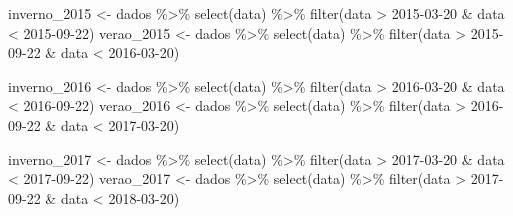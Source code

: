 \documentclass[
]{article}
\newenvironment{Shaded}{\begin{snugshade}}{\end{snugshade}}
\newcommand{\FunctionTok}[1]{\textcolor[rgb]{0.00,0.00,0.00}{#1}}
\newcommand{\NormalTok}[1]{#1}
\newcommand{\OtherTok}[1]{\textcolor[rgb]{0.56,0.35,0.01}{#1}}
\newcommand{\SpecialCharTok}[1]{\textcolor[rgb]{0.00,0.00,0.00}{#1}}
\newcommand{\StringTok}[1]{\textcolor[rgb]{0.31,0.60,0.02}{#1}}
\begin{document}
\begin{Shaded}
\begin{Highlighting}[]
\NormalTok{inverno\_2015 }\OtherTok{\textless{}{-}}\NormalTok{ dados }\SpecialCharTok{\%\textgreater{}\%} \FunctionTok{select}\NormalTok{(data) }\SpecialCharTok{\%\textgreater{}\%} \FunctionTok{filter}\NormalTok{(data }\SpecialCharTok{\textgreater{}} \StringTok{\textquotesingle{}2015{-}03{-}20\textquotesingle{}} \SpecialCharTok{\&}\NormalTok{ data }\SpecialCharTok{\textless{}} \StringTok{\textquotesingle{}2015{-}09{-}22\textquotesingle{}}\NormalTok{)}
\NormalTok{verao\_2015 }\OtherTok{\textless{}{-}}\NormalTok{ dados }\SpecialCharTok{\%\textgreater{}\%} \FunctionTok{select}\NormalTok{(data) }\SpecialCharTok{\%\textgreater{}\%}  \FunctionTok{filter}\NormalTok{(data }\SpecialCharTok{\textgreater{}} \StringTok{\textquotesingle{}2015{-}09{-}22\textquotesingle{}} \SpecialCharTok{\&}\NormalTok{ data }\SpecialCharTok{\textless{}} \StringTok{\textquotesingle{}2016{-}03{-}20\textquotesingle{}}\NormalTok{)}

\NormalTok{inverno\_2016 }\OtherTok{\textless{}{-}}\NormalTok{ dados }\SpecialCharTok{\%\textgreater{}\%} \FunctionTok{select}\NormalTok{(data) }\SpecialCharTok{\%\textgreater{}\%} \FunctionTok{filter}\NormalTok{(data }\SpecialCharTok{\textgreater{}} \StringTok{\textquotesingle{}2016{-}03{-}20\textquotesingle{}} \SpecialCharTok{\&}\NormalTok{ data }\SpecialCharTok{\textless{}} \StringTok{\textquotesingle{}2016{-}09{-}22\textquotesingle{}}\NormalTok{)}
\NormalTok{verao\_2016 }\OtherTok{\textless{}{-}}\NormalTok{ dados }\SpecialCharTok{\%\textgreater{}\%} \FunctionTok{select}\NormalTok{(data) }\SpecialCharTok{\%\textgreater{}\%}  \FunctionTok{filter}\NormalTok{(data }\SpecialCharTok{\textgreater{}} \StringTok{\textquotesingle{}2016{-}09{-}22\textquotesingle{}} \SpecialCharTok{\&}\NormalTok{ data }\SpecialCharTok{\textless{}} \StringTok{\textquotesingle{}2017{-}03{-}20\textquotesingle{}}\NormalTok{)}

\NormalTok{inverno\_2017 }\OtherTok{\textless{}{-}}\NormalTok{ dados }\SpecialCharTok{\%\textgreater{}\%} \FunctionTok{select}\NormalTok{(data) }\SpecialCharTok{\%\textgreater{}\%} \FunctionTok{filter}\NormalTok{(data }\SpecialCharTok{\textgreater{}} \StringTok{\textquotesingle{}2017{-}03{-}20\textquotesingle{}} \SpecialCharTok{\&}\NormalTok{ data }\SpecialCharTok{\textless{}} \StringTok{\textquotesingle{}2017{-}09{-}22\textquotesingle{}}\NormalTok{)}
\NormalTok{verao\_2017 }\OtherTok{\textless{}{-}}\NormalTok{ dados }\SpecialCharTok{\%\textgreater{}\%} \FunctionTok{select}\NormalTok{(data) }\SpecialCharTok{\%\textgreater{}\%}  \FunctionTok{filter}\NormalTok{(data }\SpecialCharTok{\textgreater{}} \StringTok{\textquotesingle{}2017{-}09{-}22\textquotesingle{}} \SpecialCharTok{\&}\NormalTok{ data }\SpecialCharTok{\textless{}} \StringTok{\textquotesingle{}2018{-}03{-}20\textquotesingle{}}\NormalTok{)}


\end{Highlighting}
\end{Shaded}
\end{document}
